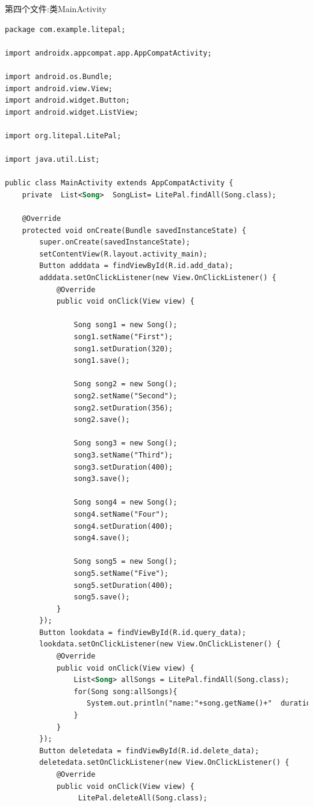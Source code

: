 \documentclass[cs4size,a4paper]{ctexart}
\numberwithin{equation}{section}
\numberwithin{table}{section}
\numberwithin{figure}{section}
\begin{document}
第四个文件:类MainActivity
\begin{lstlisting}[language=xml]
package com.example.litepal;

import androidx.appcompat.app.AppCompatActivity;

import android.os.Bundle;
import android.view.View;
import android.widget.Button;
import android.widget.ListView;

import org.litepal.LitePal;

import java.util.List;

public class MainActivity extends AppCompatActivity {
    private  List<Song>  SongList= LitePal.findAll(Song.class);

    @Override
    protected void onCreate(Bundle savedInstanceState) {
        super.onCreate(savedInstanceState);
        setContentView(R.layout.activity_main);
        Button adddata = findViewById(R.id.add_data);
        adddata.setOnClickListener(new View.OnClickListener() {
            @Override
            public void onClick(View view) {

                Song song1 = new Song();
                song1.setName("First");
                song1.setDuration(320);
                song1.save();

                Song song2 = new Song();
                song2.setName("Second");
                song2.setDuration(356);
                song2.save();

                Song song3 = new Song();
                song3.setName("Third");
                song3.setDuration(400);
                song3.save();

                Song song4 = new Song();
                song4.setName("Four");
                song4.setDuration(400);
                song4.save();

                Song song5 = new Song();
                song5.setName("Five");
                song5.setDuration(400);
                song5.save();
            }
        });
        Button lookdata = findViewById(R.id.query_data);
        lookdata.setOnClickListener(new View.OnClickListener() {
            @Override
            public void onClick(View view) {
                List<Song> allSongs = LitePal.findAll(Song.class);
                for(Song song:allSongs){
                   System.out.println("name:"+song.getName()+"  duration:"+song.getDuration());
                }
            }
        });
        Button deletedata = findViewById(R.id.delete_data);
        deletedata.setOnClickListener(new View.OnClickListener() {
            @Override
            public void onClick(View view) {
                 LitePal.deleteAll(Song.class);


\end{lstlisting}
\end{document}
